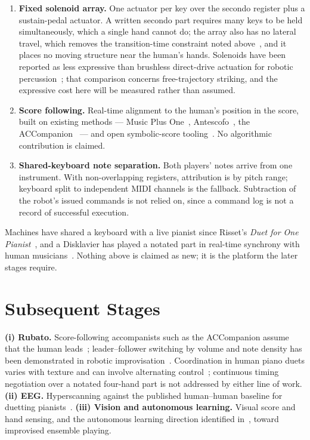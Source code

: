 \documentclass[11pt]{article}
\begin{document}
\begin{enumerate}[label=\textbf{\Alph*.}]
  \item \textbf{Fixed solenoid array.} One actuator per key over the secondo register plus a
        sustain-pedal actuator. A written secondo part requires many keys to be held simultaneously,
        which a single hand cannot do; the array also has no lateral travel, which removes the
        transition-time constraint noted above~\cite{wang2024cooperative}, and it places no moving
        structure near the human's hands. Solenoids have been reported as less expressive than
        brushless direct-drive actuation for robotic percussion~\cite{nime2020bldc}; that comparison
        concerns free-trajectory striking, and the expressive cost here will be measured rather than
        assumed.
  \item \textbf{Score following.} Real-time alignment to the human's position in the score, built on
        existing methods --- Music Plus One~\cite{raphael2010musicplusone},
        Antescofo~\cite{cont2008antescofo}, the ACCompanion~\cite{cancinochacon2023accompanion} ---
        and open symbolic-score tooling~\cite{partitura2022}. No algorithmic contribution is claimed.
  \item \textbf{Shared-keyboard note separation.} Both players' notes arrive from one instrument.
        With non-overlapping registers, attribution is by pitch range; keyboard split to independent
        MIDI channels is the fallback. Subtraction of the robot's issued commands is not relied on,
        since a command log is not a record of successful execution.
\end{enumerate}

\noindent
Machines have shared a keyboard with a live pianist since Risset's \emph{Duet for One
Pianist}~\cite{risset1996duet}, and a Disklavier has played a notated part in real-time synchrony
with human musicians~\cite{muens2017,yamaha2016ensemble}. Nothing above is claimed as new; it is the
platform the later stages require.

\section{Subsequent Stages}
\label{sec:future}
\textbf{(i) Rubato.} Score-following accompanists such as the ACCompanion assume that the human
leads~\cite{cancinochacon2023accompanion}; leader--follower switching by volume and note density has
been demonstrated in robotic improvisation~\cite{weinberg2009jam}. Coordination in human piano duets
varies with texture and can involve alternating control~\cite{predictivecoding2026}; continuous
timing negotiation over a notated four-hand part is not addressed by either line of work.
\textbf{(ii) EEG.} Hyperscanning against the published human--human baseline for duetting
pianists~\cite{hyperscanning2021}.
\textbf{(iii) Vision and autonomous learning.} Visual score and hand sensing, and the autonomous
learning direction identified in~\cite{wang2024cooperative}, toward improvised ensemble playing.



\end{document}
